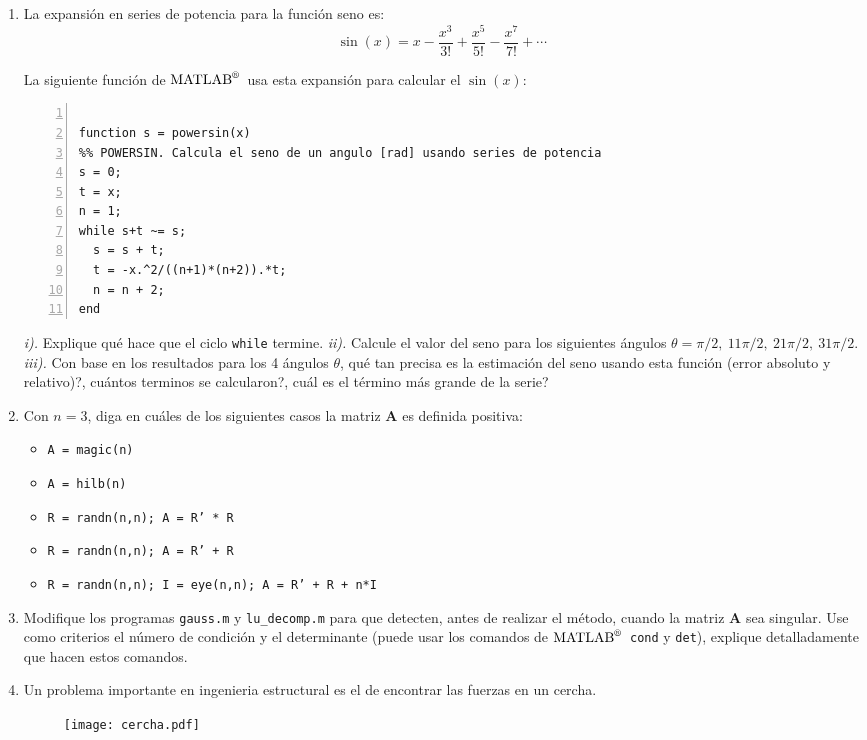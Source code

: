 \documentclass[letterpaper,12pt]{exam}
\newcommand{\matlab}{$\text{MATLAB}^{\text{\textregistered}}$~}
\begin{document}
\begin{enumerate}
 \item La expansión en series de potencia para la función seno es:
  \begin{equation}
   \sin(x) = x - \frac{x^3}{3!} + \frac{x^5}{5!} - \frac{x^7}{7!} + \cdots
  \end{equation}
 
 La siguiente función de \matlab usa esta expansión para calcular el $\sin(x)$:
 \lstset{language=Matlab}
\begin{lstlisting}[numbers=left]

function s = powersin(x)
%% POWERSIN. Calcula el seno de un angulo [rad] usando series de potencia
s = 0;
t = x;
n = 1;
while s+t ~= s;
  s = s + t;
  t = -x.^2/((n+1)*(n+2)).*t;
  n = n + 2;
end
 \end{lstlisting}
 \emph{i).} Explique qué hace que el ciclo \texttt{while} termine. \emph{ii).} Calcule el valor del seno para los siguientes ángulos $\theta=\pi/2,~11\pi/2,~21\pi/2,~31\pi/2$. \emph{iii).} Con base en los resultados para los 4 ángulos $\theta$, qué tan precisa es la estimación del seno usando esta función (error absoluto y relativo)?, cuántos terminos se calcularon?, cuál es el término más grande de la serie?

 \item Con $n=3$, diga en cuáles de los siguientes casos la matriz $\mathbf{A}$ es definida positiva:
 \begin{itemize}
  \item \texttt{A = magic(n)}
  \item \texttt{A = hilb(n)}
  \item \texttt{R = randn(n,n); A = R' * R}
  \item \texttt{R = randn(n,n); A = R' + R}
  \item \texttt{R = randn(n,n); I = eye(n,n); A = R' + R + n*I}
 \end{itemize}
 
 \item Modifique los programas \texttt{gauss.m} y \texttt{lu\_decomp.m} para que detecten, antes de realizar el método, cuando la matriz $\mathbf{A}$ sea singular. Use como criterios el número de condición y el determinante (puede usar los comandos de \matlab \texttt{cond} y \texttt{det}), explique detalladamente que hacen estos comandos.
 
 \item Un problema importante en ingenieria estructural es el de encontrar las fuerzas en un cercha.
 \begin{figure}[!ht]
 \centering
 \texttt{[image: cercha.pdf]}
 \end{figure}


\end{enumerate}
\end{document}
